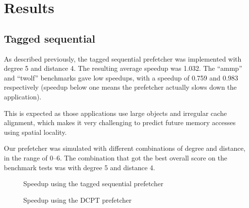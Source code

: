 \section{Results}

\subsection{Tagged sequential}

As described previously, the tagged sequential prefetcher was  implemented with
degree 5 and distance 4. The resulting average speedup was 1.032. The ``ammp''
and ``twolf'' benchmarks gave low speedups, with a speedup of
0.759 and 0.983 respectively (speedup below one means the prefetcher actually
slows down the application).


This is expected as those applications use large
objects and irregular cache alignment,  which makes it very challenging to
predict future memory accesses using spatial locality.


Our prefetcher was simulated with different combinations of degree and distance,
in the range of 0--6. The combination that got the best overall score on the
benchmark tests was with degree 5 and distance 4.

\begin{figure}[tbp]
\begin{center}
    
    \caption{Speedup using the tagged sequential prefetcher}
    \label{graph:tagged-sequential}
\end{center}
\end{figure}

\begin{figure}[tbp]
\begin{center}
    
    \caption{Speedup using the DCPT prefetcher}
    \label{graph:dcpt}
\end{center}
\end{figure}

